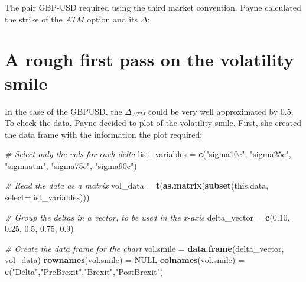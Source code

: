 \documentclass[]{book}
\newenvironment{Shaded}{\begin{snugshade}}{\end{snugshade}}
\newcommand{\KeywordTok}[1]{\textcolor[rgb]{0.13,0.29,0.53}{\textbf{#1}}}
\newcommand{\DataTypeTok}[1]{\textcolor[rgb]{0.13,0.29,0.53}{#1}}
\newcommand{\DecValTok}[1]{\textcolor[rgb]{0.00,0.00,0.81}{#1}}
\newcommand{\FloatTok}[1]{\textcolor[rgb]{0.00,0.00,0.81}{#1}}
\newcommand{\StringTok}[1]{\textcolor[rgb]{0.31,0.60,0.02}{#1}}
\newcommand{\CommentTok}[1]{\textcolor[rgb]{0.56,0.35,0.01}{\textit{#1}}}
\newcommand{\OtherTok}[1]{\textcolor[rgb]{0.56,0.35,0.01}{#1}}
\newcommand{\OperatorTok}[1]{\textcolor[rgb]{0.81,0.36,0.00}{\textbf{#1}}}
\newcommand{\NormalTok}[1]{#1}
\theoremstyle{definition}
\theoremstyle{definition}
\theoremstyle{definition}
\theoremstyle{remark}
\begin{document}
The pair GBP-USD required using the third market convention. Payne
calculated the strike of the \(ATM\) option and its \(\Delta\):

\begin{Shaded}
\end{Shaded}

\section{A rough first pass on the volatility
smile}\label{a-rough-first-pass-on-the-volatility-smile}

In the case of the GBPUSD, the \(\Delta_{ATM}\) could be very well
approximated by \(0.5\). To check the data, Payne decided to plot of the
volatility smile. First, she created the data frame with the information
the plot required:

\begin{Shaded}
\begin{Highlighting}[]
\CommentTok{# Select only the vols for each delta}
\NormalTok{list_variables =}\StringTok{ }\KeywordTok{c}\NormalTok{(}\StringTok{"sigma10c"}\NormalTok{, }\StringTok{"sigma25c"}\NormalTok{, }\StringTok{"sigmaatm"}\NormalTok{, }\StringTok{"sigma75c"}\NormalTok{, }\StringTok{"sigma90c"}\NormalTok{)}

\CommentTok{# Read the data as a matrix}
\NormalTok{vol_data =}\StringTok{ }\KeywordTok{t}\NormalTok{(}\KeywordTok{as.matrix}\NormalTok{(}\KeywordTok{subset}\NormalTok{(this.data, }\DataTypeTok{select=}\NormalTok{list_variables)))}

\CommentTok{# Group the deltas in a vector, to be used in the x-axis}
\NormalTok{delta_vector =}\StringTok{ }\KeywordTok{c}\NormalTok{(}\FloatTok{0.10}\NormalTok{, }\FloatTok{0.25}\NormalTok{, }\FloatTok{0.5}\NormalTok{, }\FloatTok{0.75}\NormalTok{, }\FloatTok{0.9}\NormalTok{)}

\CommentTok{# Create the data frame for the chart}
\NormalTok{vol.smile  =}\StringTok{ }\KeywordTok{data.frame}\NormalTok{(delta_vector, vol_data)   }
\KeywordTok{rownames}\NormalTok{(vol.smile) =}\StringTok{ }\OtherTok{NULL}
\KeywordTok{colnames}\NormalTok{(vol.smile) =}\StringTok{ }\KeywordTok{c}\NormalTok{(}\StringTok{"Delta"}\NormalTok{,}\StringTok{"PreBrexit"}\NormalTok{,}\StringTok{"Brexit"}\NormalTok{,}\StringTok{"PostBrexit"}\NormalTok{)}
\end{Highlighting}
\end{Shaded}
\end{document}
